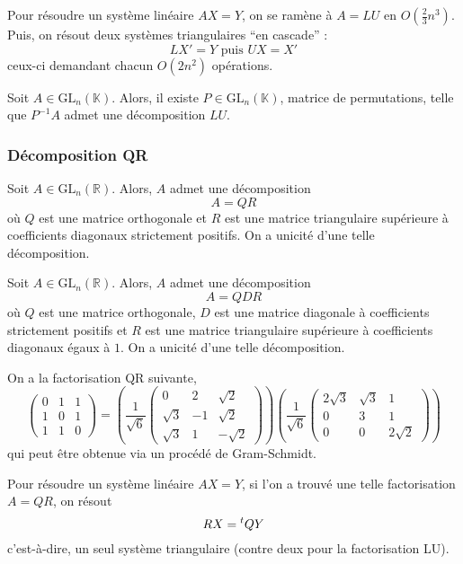   \begin{remark}
    Pour résoudre un système linéaire $AX = Y$, on se ramène à $A = LU$ en $O \left( \frac{2}{3}n^3 \right)$. Puis, on résout deux systèmes triangulaires ``en cascade'' :
    \[ LX' = Y \text{ puis } UX = X' \]
    ceux-ci demandant chacun $O(2n^2)$ opérations.
  \end{remark}

  \begin{theorem}
    Soit $A \in \mathrm{GL}_n(\mathbb{K})$. Alors, il existe $P \in \mathrm{GL}_n(\mathbb{K})$, matrice de permutations, telle que $P^{-1}A$ admet une décomposition $LU$.
  \end{theorem}

  \subsubsection{Décomposition QR}


  \begin{theorem}[Décomposition QR]
    Soit $A \in \mathrm{GL}_n(\mathbb{R})$. Alors, $A$ admet une décomposition
    \[ A = QR \]
    où $Q$ est une matrice orthogonale et $R$ est une matrice triangulaire supérieure à coefficients diagonaux strictement positifs. On a unicité d'une telle décomposition.
  \end{theorem}

  \begin{corollary}
    Soit $A \in \mathrm{GL}_n(\mathbb{R})$. Alors, $A$ admet une décomposition
    \[ A = QDR \]
    où $Q$ est une matrice orthogonale, $D$ est une matrice diagonale à coefficients strictement positifs et $R$ est une matrice triangulaire supérieure à coefficients diagonaux égaux à $1$. On a unicité d'une telle décomposition.
  \end{corollary}


  \begin{example}
    On a la factorisation QR suivante,
    \[ \begin{pmatrix} 0 & 1 & 1 \\ 1 & 0 & 1 \\ 1 & 1 & 0 \end{pmatrix} = \left( \frac{1}{\sqrt{6}} \begin{pmatrix} 0 & 2 & \sqrt{2} \\ \sqrt{3} & -1 & \sqrt{2} \\ \sqrt{3} & 1 & -\sqrt{2} \end{pmatrix} \right) \left( \frac{1}{\sqrt{6}} \begin{pmatrix} 2\sqrt{3} & \sqrt{3} & 1 \\ 0 & 3 & 1 \\ 0 & 0 & 2\sqrt{2} \end{pmatrix} \right) \]
    qui peut être obtenue via un procédé de Gram-Schmidt.
  \end{example}


  \begin{remark}
    Pour résoudre un système linéaire $AX = Y$, si l'on a trouvé une telle factorisation $A = QR$, on résout
    \[ RX = \mathstrut ^t QY \]
    c'est-à-dire, un seul système triangulaire (contre deux pour la factorisation LU).
  \end{remark}

